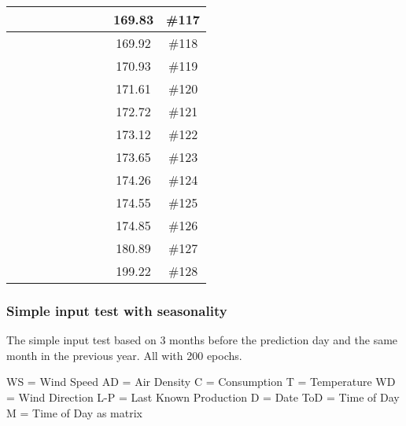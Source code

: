 \begin{center}
\begin{longtable}{|c|c|c|c|c|c|c|c|c|c|}
 \x &  \x &  \x &  \x &  \x &  &  \x &  & 169.83 & \#117 \\ \hline
 \x &  &  &  \x &  \x &  \x &  \x &  \x & 169.92 & \#118 \\ \hline
 \x &  \x &  &  \x &  &  \x &  \x &  & 170.93 & \#119 \\ \hline
 \x &  &  \x &  \x &  \x &  \x &  \x &  \x & 171.61 & \#120 \\ \hline
 \x &  &  \x &  \x &  &  \x &  \x &  & 172.72 & \#121 \\ \hline
 \x &  &  &  &  \x &  \x &  \x &  & 173.12 & \#122 \\ \hline
 \x &  &  \x &  \x &  &  \x &  \x &  \x & 173.65 & \#123 \\ \hline
 \x &  \x &  \x &  \x &  \x &  \x &  \x &  \x & 174.26 & \#124 \\ \hline
 \x &  \x &  &  \x &  &  \x &  \x &  \x & 174.55 & \#125 \\ \hline
 \x &  &  &  \x &  &  \x &  \x &  \x & 174.85 & \#126 \\ \hline
 \x &  \x &  \x &  &  \x &  \x &  \x &  & 180.89 & \#127 \\ \hline
 \x &  \x &  &  &  \x &  \x &  \x &  \x & 199.22 & \#128 \\ \hline
\end{longtable}
\label{table:windProdInputParams}
\end{center}
\normalsize

\subsubsection{Simple input test with seasonality}
\label{sec:simpleInputTestSeason}
The simple input test based on 3 months before the prediction day and the same month in the previous year. All with 200 epochs.

WS = Wind Speed
AD = Air Density
C = Consumption
T = Temperature
WD = Wind Direction
L-P = Last Known Production
D = Date
ToD = Time of Day
M = Time of Day as matrix

